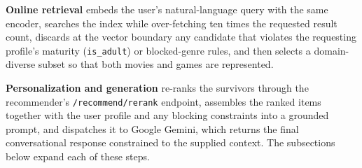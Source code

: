 \textbf{Online retrieval} embeds the user's natural-language query with the same encoder, searches the index while over-fetching ten times the requested result count, discards at the vector boundary any candidate that violates the requesting profile's maturity (\texttt{is\_adult}) or blocked-genre rules, and then selects a domain-diverse subset so that both movies and games are represented.

\textbf{Personalization and generation} re-ranks the survivors through the recommender's \texttt{/recommend/rerank} endpoint, assembles the ranked items together with the user profile and any blocking constraints into a grounded prompt, and dispatches it to Google Gemini, which returns the final conversational response constrained to the supplied context. The subsections below expand each of these steps.

